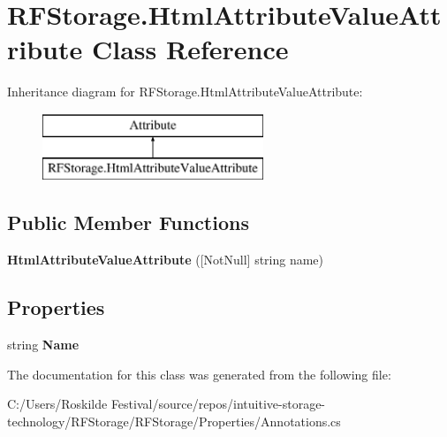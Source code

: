 \hypertarget{class_r_f_storage_1_1_html_attribute_value_attribute}{}\section{R\+F\+Storage.\+Html\+Attribute\+Value\+Attribute Class Reference}
\label{class_r_f_storage_1_1_html_attribute_value_attribute}
Inheritance diagram for R\+F\+Storage.\+Html\+Attribute\+Value\+Attribute\+:\begin{figure}[H]
\begin{center}
\leavevmode
\includegraphics[height=2.000000cm]{class_r_f_storage_1_1_html_attribute_value_attribute}
\end{center}
\end{figure}
\subsection*{Public Member Functions}
\begin{DoxyCompactItemize}
\item 
\mbox{\label{class_r_f_storage_1_1_html_attribute_value_attribute_a0c0f6211ce3bf6e378624aa7172c2a5d}} 
{\bfseries Html\+Attribute\+Value\+Attribute} (\mbox{[}Not\+Null\mbox{]} string name)
\end{DoxyCompactItemize}
\subsection*{Properties}
\begin{DoxyCompactItemize}
\item 
\mbox{\label{class_r_f_storage_1_1_html_attribute_value_attribute_ae39c49f06e17a4d6d3201f57917747d3}} 
string {\bfseries Name}
\end{DoxyCompactItemize}


The documentation for this class was generated from the following file\+:\begin{DoxyCompactItemize}
\item 
C\+:/\+Users/\+Roskilde Festival/source/repos/intuitive-\/storage-\/technology/\+R\+F\+Storage/\+R\+F\+Storage/\+Properties/Annotations.\+cs\end{DoxyCompactItemize}
